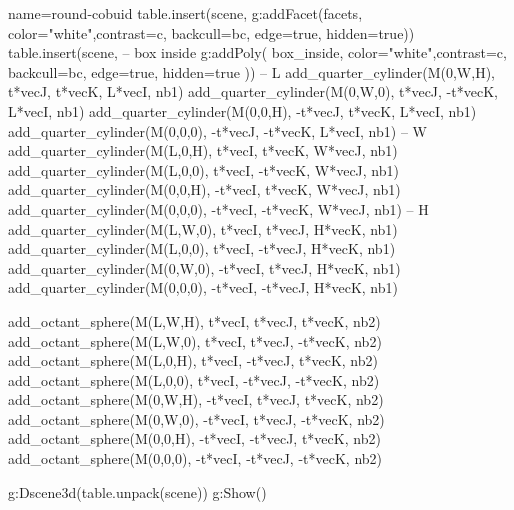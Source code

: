 \documentclass{standalone}
\begin{document}
\begin{luadraw}{name=round-cobuid}
table.insert(scene, g:addFacet(facets, {color="white",contrast=c, backcull=bc, edge=true, hidden=true}))
table.insert(scene, -- box inside
    g:addPoly( box_inside,{ color="white",contrast=c, backcull=bc, edge=true, hidden=true }))
-- L
add_quarter_cylinder(M(0,W,H), t*vecJ, t*vecK, L*vecI, nb1)
add_quarter_cylinder(M(0,W,0), t*vecJ, -t*vecK, L*vecI, nb1)
add_quarter_cylinder(M(0,0,H), -t*vecJ, t*vecK, L*vecI, nb1)
add_quarter_cylinder(M(0,0,0), -t*vecJ, -t*vecK, L*vecI, nb1)
-- W
add_quarter_cylinder(M(L,0,H), t*vecI, t*vecK, W*vecJ, nb1)
add_quarter_cylinder(M(L,0,0), t*vecI, -t*vecK, W*vecJ, nb1)
add_quarter_cylinder(M(0,0,H), -t*vecI, t*vecK, W*vecJ, nb1)
add_quarter_cylinder(M(0,0,0), -t*vecI, -t*vecK, W*vecJ, nb1)
-- H
add_quarter_cylinder(M(L,W,0), t*vecI, t*vecJ, H*vecK, nb1)
add_quarter_cylinder(M(L,0,0), t*vecI, -t*vecJ, H*vecK, nb1)
add_quarter_cylinder(M(0,W,0), -t*vecI, t*vecJ, H*vecK, nb1)
add_quarter_cylinder(M(0,0,0), -t*vecI, -t*vecJ, H*vecK, nb1)

add_octant_sphere(M(L,W,H), t*vecI, t*vecJ, t*vecK, nb2)
add_octant_sphere(M(L,W,0), t*vecI, t*vecJ, -t*vecK, nb2)
add_octant_sphere(M(L,0,H), t*vecI, -t*vecJ, t*vecK, nb2)
add_octant_sphere(M(L,0,0), t*vecI, -t*vecJ, -t*vecK, nb2)
add_octant_sphere(M(0,W,H), -t*vecI, t*vecJ, t*vecK, nb2)
add_octant_sphere(M(0,W,0), -t*vecI, t*vecJ, -t*vecK, nb2)
add_octant_sphere(M(0,0,H), -t*vecI, -t*vecJ, t*vecK, nb2)
add_octant_sphere(M(0,0,0), -t*vecI, -t*vecJ, -t*vecK, nb2)

g:Dscene3d(table.unpack(scene))
g:Show()
\end{luadraw}
\end{document}
